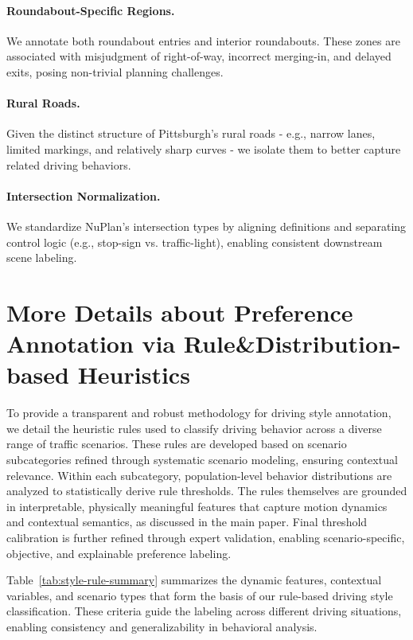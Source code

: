 \documentclass{article}
\begin{document}
\paragraph{Roundabout-Specific Regions.}
We annotate both roundabout entries and interior roundabouts. These zones are associated with misjudgment of right-of-way, incorrect merging-in, and delayed exits, posing non-trivial planning challenges.

\paragraph{Rural Roads.}
Given the distinct structure of Pittsburgh’s rural roads - e.g., narrow lanes, limited markings, and relatively sharp curves - we isolate them to better capture related driving behaviors.

\paragraph{Intersection Normalization.}
We standardize NuPlan’s intersection types by aligning definitions and separating control logic (e.g., stop-sign vs. traffic-light), enabling consistent downstream scene labeling.

\section{More Details about Preference Annotation via Rule\&Distribution-based Heuristics}\label{sec: rule_dist_ana}

To provide a transparent and robust methodology for driving style annotation, we detail the heuristic rules used to classify driving behavior across a diverse range of traffic scenarios. These rules are developed based on scenario subcategories refined through systematic scenario modeling, ensuring contextual relevance. Within each subcategory, population-level behavior distributions are analyzed to statistically derive rule thresholds. The rules themselves are grounded in interpretable, physically meaningful features that capture motion dynamics and contextual semantics, as discussed in the main paper. Final threshold calibration is further refined through expert validation, enabling scenario-specific, objective, and explainable preference labeling.

Table~\ref{tab:style-rule-summary} summarizes the dynamic features, contextual variables, and scenario types that form the basis of our rule-based driving style classification. These criteria guide the labeling across different driving situations, enabling consistency and generalizability in behavioral analysis.
\end{document}
